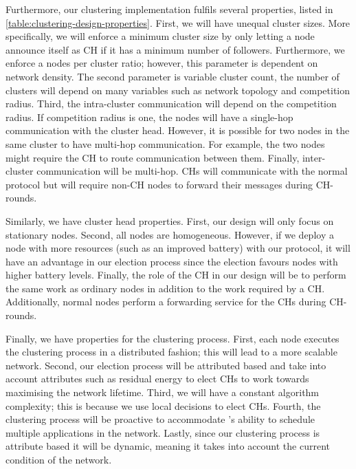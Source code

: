 Furthermore, our clustering implementation fulfils several properties, listed in \cref{table:clustering-design-properties}. First,  we will have unequal cluster sizes. More specifically, we will enforce a minimum cluster size by only letting a node announce itself as CH if it has a minimum number of followers. Furthermore, we enforce a nodes per cluster ratio; however, this parameter is dependent on network density. The second parameter is variable cluster count, the number of clusters will depend on many variables such as network topology and competition radius. Third, the intra-cluster communication will depend on the competition radius. If competition radius is one, the nodes will have a single-hop communication with the cluster head. However, it is possible for two nodes in the same cluster to have multi-hop communication. For example, the two nodes might require the CH to route communication between them. Finally, inter-cluster communication will be multi-hop. CHs will communicate with the normal \atwo{} protocol but will require non-CH nodes to forward their messages during CH-rounds.

Similarly, we have cluster head properties. First, our design will only focus on stationary nodes. Second, all nodes are homogeneous. However, if we deploy a node with more resources (such as an improved battery) with our protocol, it will have an advantage in our election process since the election favours nodes with higher battery levels. Finally, the role of the CH in our design will be to perform the same work as ordinary nodes in addition to the work required by a CH. Additionally, normal nodes perform a forwarding service for the CHs during CH-rounds.

Finally, we have properties for the clustering process. First,  each node executes the clustering process in a distributed fashion; this will lead to a more scalable network. Second, our election process will be attributed based and take into account attributes such as residual energy to elect CHs to work towards maximising the network lifetime. Third, we will have a constant algorithm complexity; this is because we use local decisions to elect CHs. Fourth, the clustering process will be proactive to accommodate \atwo{}'s ability to schedule multiple applications in the network. Lastly, since our clustering process is attribute based it will be dynamic, meaning it takes into account the current condition of the network.



